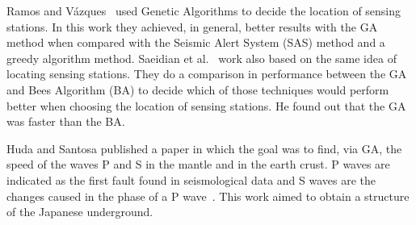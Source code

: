 Ramos and Vázques~\cite{Ramos2011} used Genetic Algorithms to decide the location of sensing stations. In this work they achieved, in general, better results with the GA method when compared with the Seismic Alert System (SAS) method and a greedy algorithm method. Saeidian et al.~\cite{saeidian2016evaluation} work also based on the same idea of locating sensing stations. They do a comparison in performance between the GA and Bees Algorithm (BA) to decide which of those techniques would perform better when choosing the location of sensing stations. He found out that the GA was faster than the BA.

Huda and Santosa \cite{ijse5762} published a paper in which the goal was to find, via GA, the speed of the waves P and S in the mantle and in the earth crust. P waves are indicated as the first fault found in seismological data and S waves are the changes caused in the phase of a P wave~\cite{ijse5762}. This work aimed to obtain a structure of the Japanese underground.


%	
%
%

